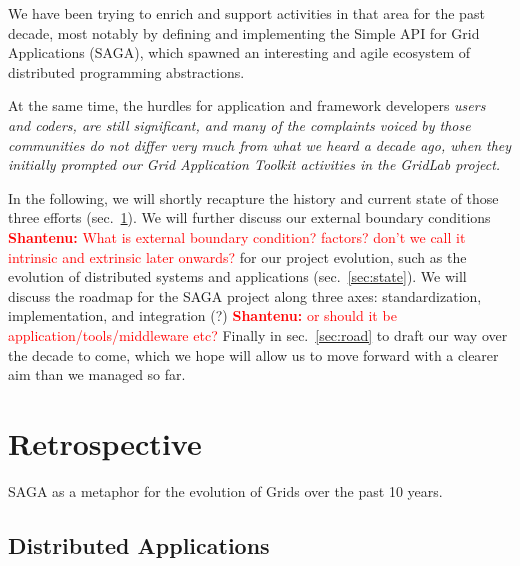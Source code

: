\documentclass{article}
\newcommand{\B}[1]{\textbf{#1}}
\newcommand{\jhanote}[1]{{\textcolor{red}{     \B{Shantenu:} #1 }}}
\newcommand{\jhanote}[1]{}
\begin{document}
We have been trying to enrich and support activities in that area for
the past decade, most notably by defining and implementing the Simple
API for Grid Applications (SAGA), which spawned an interesting and
agile ecosystem of distributed programming abstractions.
 
At the same time, the hurdles for application and framework
developers \it{users} and coders, are still significant, and many of
the complaints voiced by those communities do not differ very much
from what we heard a decade ago, when they initially prompted our Grid
Application Toolkit activities in the GridLab project.


 
In the following, we will shortly recapture the history and current
state of those three efforts (sec.~\ref{sec:retro}).  We will further
discuss our external boundary conditions \jhanote{What is external
  boundary condition? factors? don't we call it intrinsic and
  extrinsic later onwards?} for our project evolution, such as the
evolution of distributed systems and applications
(sec.~\ref{sec:state}).  We will discuss the roadmap for the SAGA
project along three axes: standardization, implementation, and
integration (?) \jhanote{ or should it be application/tools/middleware
  etc?}  Finally in sec.~\ref{sec:road} to draft our way over the
decade to come, which we hope will allow us to move forward with a
clearer aim than we managed so far.







\section{Retrospective}
\label{sec:retro}


SAGA as a metaphor for the evolution of Grids over the past 10 years.

 \subsection{Distributed Applications}
\end{document}
